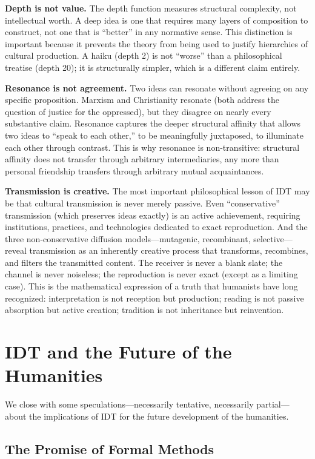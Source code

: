 \documentclass[11pt,openany]{book}
\theoremstyle{definition}
\theoremstyle{plain}
\theoremstyle{remark}
\begin{document}
\textbf{Depth is not value.} The depth function measures structural complexity, not intellectual worth. A deep idea is one that requires many layers of composition to construct, not one that is ``better'' in any normative sense. This distinction is important because it prevents the theory from being used to justify hierarchies of cultural production. A haiku (depth 2) is not ``worse'' than a philosophical treatise (depth 20); it is structurally simpler, which is a different claim entirely.

\textbf{Resonance is not agreement.} Two ideas can resonate without agreeing on any specific proposition. Marxism and Christianity resonate (both address the question of justice for the oppressed), but they disagree on nearly every substantive claim. Resonance captures the deeper structural affinity that allows two ideas to ``speak to each other,'' to be meaningfully juxtaposed, to illuminate each other through contrast. This is why resonance is non-transitive: structural affinity does not transfer through arbitrary intermediaries, any more than personal friendship transfers through arbitrary mutual acquaintances.

\textbf{Transmission is creative.} The most important philosophical lesson of IDT may be that cultural transmission is never merely passive. Even ``conservative'' transmission (which preserves ideas exactly) is an active achievement, requiring institutions, practices, and technologies dedicated to exact reproduction. And the three non-conservative diffusion models---mutagenic, recombinant, selective---reveal transmission as an inherently creative process that transforms, recombines, and filters the transmitted content. The receiver is never a blank slate; the channel is never noiseless; the reproduction is never exact (except as a limiting case). This is the mathematical expression of a truth that humanists have long recognized: interpretation is not reception but production; reading is not passive absorption but active creation; tradition is not inheritance but reinvention.

\section{IDT and the Future of the Humanities}

We close with some speculations---necessarily tentative, necessarily partial---about the implications of IDT for the future development of the humanities.

\subsection{The Promise of Formal Methods}
\end{document}
